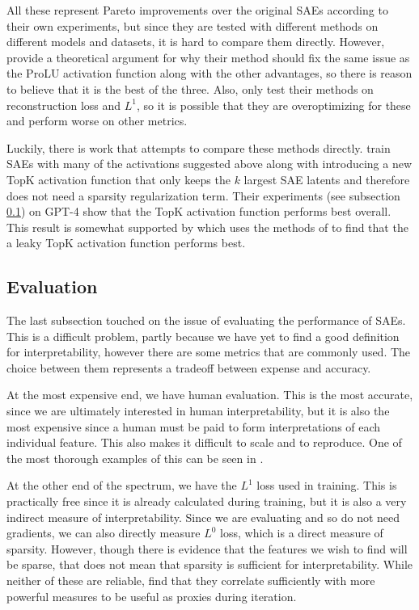 All these represent Pareto improvements over the original SAEs according to their own experiments, but since they are tested with different methods on different models and datasets, it is hard to compare them directly.
However, \textcite{rajamanoharan_improving_2024} provide a theoretical argument for why their method should fix the same issue as the ProLU activation function along with the other advantages, so there is reason to believe that it is the best of the three.
Also, \textcite{riggs_improving_2024} only test their methods on reconstruction loss and $L^1$, so it is possible that they are overoptimizing for these and perform worse on other metrics.

Luckily, there is work that attempts to compare these methods directly.
\textcite{gao_scaling_2024} train SAEs with many of the activations suggested above along with introducing a new TopK activation function that only keeps the $k$ largest SAE latents and therefore does not need a sparsity regularization term.
Their experiments (see subsection \ref{sec:evaluation}) on GPT-4 \parencite{openai_gpt-4_2024} show that the TopK activation function performs best overall.
This result is somewhat supported by \textcite{quaisley_research_2024} which uses the methods of \textcite{huben_research_2024} to find that the a leaky TopK activation function performs best.



\subsection{Evaluation}
\label{sec:evaluation}
The last subsection touched on the issue of evaluating the performance of SAEs.
This is a difficult problem, partly because we have yet to find a good definition for interpretability, however there are some metrics that are commonly used.
The choice between them represents a tradeoff between expense and accuracy.

At the most expensive end, we have human evaluation.
This is the most accurate, since we are ultimately interested in human interpretability, but it is also the most expensive since a human must be paid to form interpretations of each individual feature.
This also makes it difficult to scale and to reproduce.
One of the most thorough examples of this can be seen in \textcite{bricken_towards_2023}.

At the other end of the spectrum, we have the $L^1$ loss used in training.
This is practically free since it is already calculated during training, but it is also a very indirect measure of interpretability.
Since we are evaluating and so do not need gradients, we can also directly measure $L^0$ loss, which is a direct measure of sparsity.
However, though there is evidence that the features we wish to find will be sparse, that does not mean that sparsity is sufficient for interpretability.
While neither of these are reliable, \textcite{bricken_towards_2023} find that they correlate sufficiently with more powerful measures to be useful as proxies during iteration.

